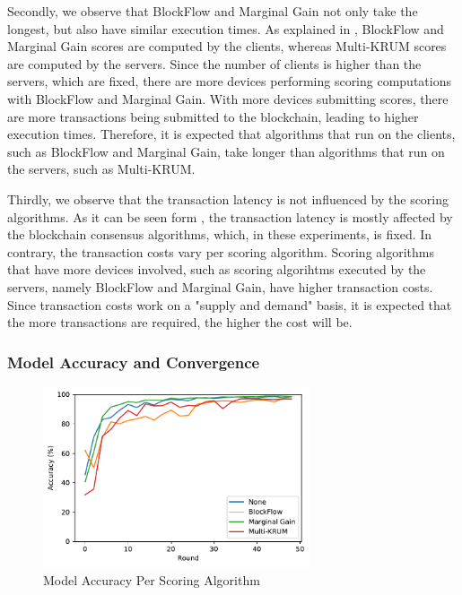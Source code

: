 Secondly, we observe that BlockFlow and Marginal Gain not only take the longest, but also have similar execution times. As explained in , BlockFlow and Marginal Gain scores are computed by the clients, whereas Multi-KRUM scores are computed by the servers. Since the number of clients is higher than the servers, which are fixed, there are more devices performing scoring computations with BlockFlow and Marginal Gain. With more devices submitting scores, there are more transactions being submitted to the blockchain, leading to higher execution times. Therefore, it is expected that algorithms that run on the clients, such as BlockFlow and Marginal Gain, take longer than algorithms that run on the servers, such as Multi-KRUM.

Thirdly, we observe that the transaction latency is not influenced by the scoring algorithms. As it can be seen form , the transaction latency is mostly affected by the blockchain consensus algorithms, which, in these experiments, is fixed. In contrary, the transaction costs vary per scoring algorithm. Scoring algorithms that have more devices involved, such as scoring algorihtms executed by the servers, namely BlockFlow and Marginal Gain, have higher transaction costs. Since transaction costs work on a "supply and demand" basis, it is expected that the more transactions are required, the higher the cost will be.

\subsubsection{Model Accuracy and Convergence}

\begin{figure}[!ht]
    \centering
    \centering
    \includegraphics[width=0.7\textwidth]{graphics/scoring/accuracy.pdf}
    \caption{Model Accuracy Per Scoring Algorithm}
    \label{fig:accuracy_scoring}
\end{figure}

